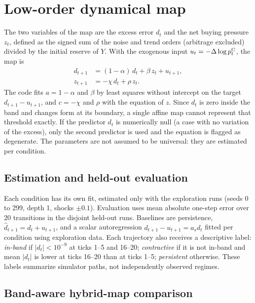 \section{Low-order dynamical map}

The two variables of the map are the excess error $d_t$ and the net buying pressure $z_t$, defined as the signed sum of the noise and trend orders (arbitrage excluded) divided by the initial reserve of $Y$. With the exogenous input $u_t=-\Delta\log p^{\mathrm{C}}_t$, the map is
\begin{align}
  d_{t+1} &= (1-\alpha)\,d_t + \beta\,z_t + u_{t+1}, \label{eq:mapa-d}\\
  z_{t+1} &= -\chi\,d_t + \rho\,z_t. \label{eq:mapa-z}
\end{align}
The code fits $a=1-\alpha$ and $\beta$ by least squares without intercept on the target $d_{t+1}-u_{t+1}$, and $c=-\chi$ and $\rho$ with the equation of $z$. Since $d_t$ is zero inside the band and changes form at its boundary, a single affine map cannot represent that threshold exactly. If the predictor $d_t$ is numerically null (a case with no variation of the excess), only the second predictor is used and the equation is flagged as degenerate. The parameters are not assumed to be universal: they are estimated per condition.


\subsection{Estimation and held-out evaluation}

Each condition has its own fit, estimated only with the exploration runs (seeds 0 to 299, depth 1, shocks $\pm0.1$). Evaluation uses mean absolute one-step error over 20 transitions in the disjoint held-out runs. Baselines are persistence, $\hat d_{t+1}=d_t+u_{t+1}$, and a scalar autoregression $d_{t+1}-u_{t+1}=a_s d_t$ fitted per condition using exploration data. Each trajectory also receives a descriptive label: \emph{in-band} if $|d_t|<10^{-9}$ at ticks 1--5 and 16--20; \emph{contractive} if it is not in-band and mean $|d_t|$ is lower at ticks 16--20 than at ticks 1--5; \emph{persistent} otherwise. These labels summarize simulator paths, not independently observed regimes.

\subsection{Band-aware hybrid-map comparison}
\label{sec:hybrid-method}

